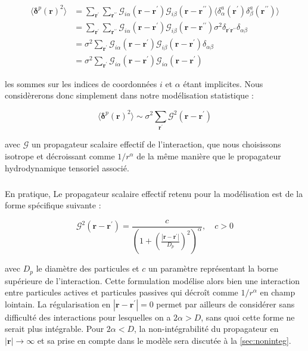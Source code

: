 \begin{equation}
\begin{aligned}
	\langle\boldsymbol\delta^p(\mathbf{r})^2\rangle &= \sum_{\mathbf{r}^\prime}\sum_{\mathbf{r}^{\prime\prime}}\mathcal{G}_{i\alpha}(\mathbf{r}-\mathbf{r}^\prime)\mathcal{G}_{i\beta}(\mathbf{r}-\mathbf{r}^{\prime\prime})\langle\delta^a_\alpha(\mathbf{r}^\prime)\delta^a_\beta(\mathbf{r}^{\prime\prime})\rangle \\
	&= \sum_{\mathbf{r}^\prime}\sum_{\mathbf{r}^{\prime\prime}}\mathcal{G}_{i\alpha}(\mathbf{r}-\mathbf{r}^\prime)\mathcal{G}_{i\beta}(\mathbf{r}-\mathbf{r}^{\prime\prime})\sigma^2\delta_{\mathbf{r}^\prime\mathbf{r}^{\prime\prime}}\delta_{\alpha\beta}\\
	&= \sigma^2\sum_{\mathbf{r}^\prime}\mathcal{G}_{i\alpha}(\mathbf{r}-\mathbf{r}^\prime)\mathcal{G}_{i\beta}(\mathbf{r}-\mathbf{r}^{\prime})\delta_{\alpha\beta}\\
	&= \sigma^2 \sum_{\mathbf{r}^\prime}\mathcal{G}_{i\alpha}(\mathbf{r}-\mathbf{r}^\prime)\mathcal{G}_{i\alpha}(\mathbf{r}-\mathbf{r}^{\prime})
\end{aligned}
\end{equation}

\noindent les sommes sur les indices de coordonnées $i$ et $\alpha$ étant implicites. Nous considèrerons donc simplement dans notre modélisation statistique :

\begin{equation}
	\langle \boldsymbol\delta^p(\mathbf{r})^2 \rangle \sim \sigma^2 \sum_{\mathbf{r}^\prime} \mathcal{G}^2(\mathbf{r}-\mathbf{r}^\prime)
	\label{eq:convol_model}
\end{equation}

\noindent avec $\mathcal{G}$ un propagateur scalaire effectif de l'interaction, que nous choisissons isotrope et décroissant comme $1/r^{\alpha}$ de la même manière que le propagateur hydrodynamique tensoriel associé.

\subparagraph{}En pratique, Le propagateur scalaire effectif retenu pour la modélisation est de la forme spécifique suivante :

\begin{equation}
	\mathcal{G}^2(\mathbf{r}-\mathbf{r}^\prime) = \frac{c}{\left(1+\left(\frac{|\mathbf{r}-\mathbf{r}^\prime|}{D_p}\right)^2\right)^\alpha}, \quad c > 0
\end{equation}

\noindent avec $D_p$ le diamètre des particules et $c$ un paramètre représentant la borne supérieure de l'interaction. Cette formulation modélise alors bien une interaction entre particules actives et particules passives qui décroît comme $1/r^\alpha$ en champ lointain. La régularisation en $|\mathbf{r}-\mathbf{r}^\prime|=0$ permet par ailleurs de considérer sans difficulté des interactions pour lesquelles on a $2\alpha > D$, sans quoi cette forme ne serait plus intégrable. Pour $2\alpha < D$, la non-intégrabilité du propagateur en $|\mathbf{r}|\rightarrow\infty$ et sa prise en compte dans le modèle sera discutée à la \autoref{sec:noninteg}.

